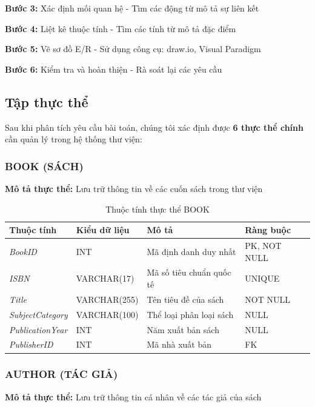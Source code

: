\documentclass[12pt,a4paper]{article}
\newcommand{\attr}[1]{\textit{#1}}
\begin{document}
\textbf{Bước 3:} Xác định mối quan hệ - Tìm các động từ mô tả sự liên kết

\textbf{Bước 4:} Liệt kê thuộc tính - Tìm các tính từ mô tả đặc điểm

\textbf{Bước 5:} Vẽ sơ đồ E/R - Sử dụng công cụ: draw.io, Visual Paradigm

\textbf{Bước 6:} Kiểm tra và hoàn thiện - Rà soát lại các yêu cầu

\subsection{Tập thực thể}

Sau khi phân tích yêu cầu bài toán, chúng tôi xác định được \textbf{6 thực thể chính} cần quản lý trong hệ thống thư viện:

\subsubsection{BOOK (SÁCH)}

\textbf{Mô tả thực thể:} Lưu trữ thông tin về các cuốn sách trong thư viện

\begin{table}[H]
\centering
\caption{Thuộc tính thực thể BOOK}
\begin{tabular}{@{}|l|l|p{6cm}|l|@{}}
\hline
\textbf{Thuộc tính} & \textbf{Kiểu dữ liệu} & \textbf{Mô tả} & \textbf{Ràng buộc} \\ \hline
\attr{BookID} & INT & Mã định danh duy nhất & PK, NOT NULL \\ \hline
\attr{ISBN} & VARCHAR(17) & Mã số tiêu chuẩn quốc tế & UNIQUE \\ \hline
\attr{Title} & VARCHAR(255) & Tên tiêu đề của sách & NOT NULL \\ \hline
\attr{SubjectCategory} & VARCHAR(100) & Thể loại phân loại sách & NULL \\ \hline
\attr{PublicationYear} & INT & Năm xuất bản sách & NULL \\ \hline
\attr{PublisherID} & INT & Mã nhà xuất bản & FK \\ \hline
\end{tabular}
\end{table}

\subsubsection{AUTHOR (TÁC GIẢ)}

\textbf{Mô tả thực thể:} Lưu trữ thông tin cá nhân về các tác giả của sách
\end{document}
